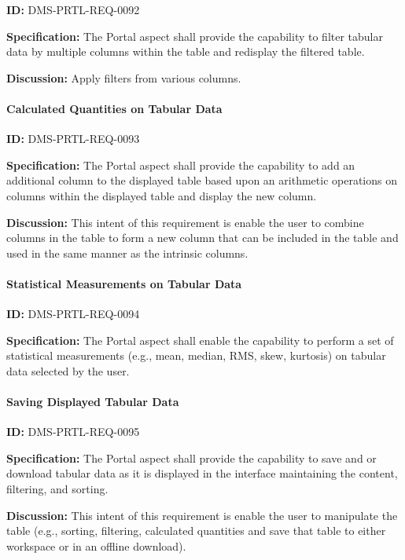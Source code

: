 \documentclass[SE,toc,lsstdraft]{lsstdoc}
\begin{document}
\label{DMS-PRTL-REQ-0092}
\textbf{ID:} DMS-PRTL-REQ-0092

\textbf{Specification:}
The Portal aspect shall provide the capability to filter tabular data by multiple columns within the table and redisplay the filtered table.

\textbf{Discussion:}
Apply filters from various columns.

\paragraph{Calculated Quantities on Tabular Data}\hfill  %

\label{DMS-PRTL-REQ-0093}
\textbf{ID:} DMS-PRTL-REQ-0093

\textbf{Specification:}
The Portal aspect shall provide the capability to add an additional column to the displayed table based upon an arithmetic operations on columns within the displayed table and display the new column.

\textbf{Discussion:}
This intent of this requirement is enable the user to combine columns in the table to form a new column that can be included in the table and used in the same manner as the intrinsic columns.

\paragraph{Statistical Measurements on Tabular Data}\hfill  %

\label{DMS-PRTL-REQ-0094}
\textbf{ID:} DMS-PRTL-REQ-0094

\textbf{Specification:}
The Portal aspect shall enable the capability to perform a set of statistical measurements (e.g., mean, median, RMS, skew, kurtosis) on tabular data selected by the user.

\paragraph{Saving Displayed Tabular Data}\hfill  %

\label{DMS-PRTL-REQ-0095}
\textbf{ID:} DMS-PRTL-REQ-0095

\textbf{Specification:}
The Portal aspect shall provide the capability to save and or download tabular data as it is displayed in the interface maintaining the content, filtering, and sorting.

\textbf{Discussion:}
This intent of this requirement is enable the user to manipulate the table (e.g., sorting, filtering, calculated quantities and save that table to either workspace or in an offline download).
\end{document}
